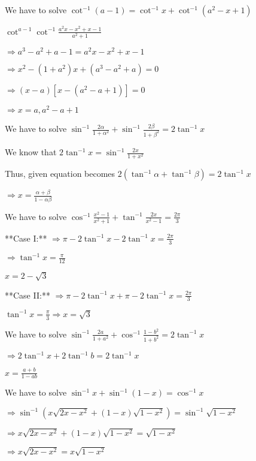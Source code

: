 \item We have to solve $\cot^{-1}(a - 1) = \cot^{-1}x + \cot^{-1}(a^2 - x + 1)$

  $\cot^{a - 1} \cot^{-1}\frac{a^2x - x^2 + x - 1}{a^2 + 1}$

  $\Rightarrow a^3 - a^2 + a - 1 = a^2x - x^2 + x - 1$

  $\Rightarrow x^2 - (1 + a^2)x + (a^3 - a^2  + a) = 0$

  $\Rightarrow (x - a)[x - (a^2 - a + 1)] = 0$

  $\Rightarrow x = a, a^2 - a + 1$

\item We have to solve $\sin^{-1}\frac{2\alpha}{1 + \alpha^2} + \sin^{-1}\frac{2\beta}{1 + \beta^2} = 2\tan^{-1}x$

  We know that $2\tan^{-1}x = \sin^{-1}\frac{2x}{1 + x^2}$

  Thus, given equation becomes $2(\tan^{-1}\alpha + \tan^{-1}\beta) = 2\tan^{-1}x$

  $\Rightarrow x = \frac{\alpha + \beta}{1 - \alpha\beta}$

\item We have to solve $\cos^{-1}\frac{x^2 - 1}{x^2 + 1} + \tan^{-1}\frac{2x}{x^2 - 1} = \frac{2\pi}{3}$

  **Case I:** $\Rightarrow \pi - 2\tan^{-1}x - 2\tan^{-1}x = \frac{2\pi}{3}$

  $\Rightarrow \tan^{-1}x = \frac{\pi}{12}$

  $x = 2 - \sqrt{3}$

  **Case II:** $\Rightarrow \pi - 2\tan^{-1}x + \pi - 2\tan^{-1}x = \frac{2\pi}{3}$

  $\tan^{-1}x = \frac{\pi}{3} \Rightarrow x = \sqrt{3}$

\item We have to solve $\sin^{-1}\frac{2a}{1 + a^2} + \cos^{-1}\frac{1 - b^2}{1 + b^2} = 2\tan^{-1}x$

  $\Rightarrow 2\tan^{-1}x + 2\tan^{-1}b = 2\tan^{-1}x$

  $x = \frac{a + b}{1 - ab}$

\item We have to solve $\sin^{-1}x + \sin^{-1}(1 - x) = \cos^{-1}x$

  $\Rightarrow \sin^{-1}\left(x\sqrt{2x - x^2} + (1 - x)\sqrt{1 - x^2}\right) = \sin^{-1}\sqrt{1 - x^2}$

  $\Rightarrow x\sqrt{2x - x^2} + (1 - x)\sqrt{1 - x^2} = \sqrt{1 - x^2}$

  $\Rightarrow x\sqrt{2x - x^2} = x\sqrt{1 - x^2}$

